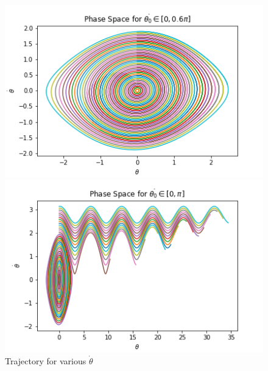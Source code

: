 \documentclass[12pt]{article}
\newenvironment{problem}[2][]{\begin{trivlist}
\item[\hskip \labelsep {\bfseries #1}\hskip \labelsep {\bfseries #2.}]}{\end{trivlist}}
\begin{document}
\begin{problem}{1}
\begin{figure}[ht!]
	\centering
	\begin{minipage}[b]{0.4\textwidth}
		\includegraphics[scale=0.6]{../figures/phaseSpaceDot.png}
	\end{minipage}
	\hfill
	\begin{minipage}[b]{0.4\textwidth}
		\includegraphics[scale=0.6]{../figures/phaseSpaceDot2.png}
	\end{minipage}
	\caption{Trajectory for various $\dot{\theta}$}
	\label{phaseDot}
\end{figure}
\end{problem}
\end{document}
